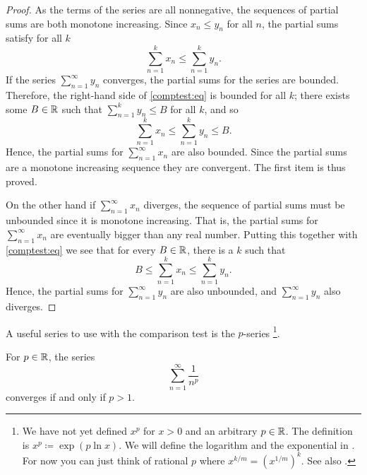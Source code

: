 \begin{proof}
As the terms of the series are all nonnegative, the sequences of
partial sums are both monotone increasing.
Since $x_n \leq y_n$ for all $n$, the partial sums
satisfy for all $k$
\begin{equation} \label{comptest:eq}
\sum_{n=1}^k x_n \leq \sum_{n=1}^k y_n .
\end{equation}
If the series $\sum_{n=1}^\infty y_n$ converges, the partial sums for the series
are bounded.  Therefore, the right-hand side of \eqref{comptest:eq}
is bounded for all $k$; there exists some $B \in {\mathbb{R}}$ such that
$\sum_{n=1}^k y_n \leq B$ for all $k$, and so
\begin{equation*}
\sum_{n=1}^k x_n \leq \sum_{n=1}^k y_n \leq B.
\end{equation*}
Hence, the partial sums for $\sum_{n=1}^\infty x_n$
are also bounded.  Since the partial sums are a monotone increasing sequence
they are convergent.  The first item is thus proved.

On the other hand if $\sum_{n=1}^\infty x_n$ diverges, the sequence of partial sums
must be unbounded since it is monotone increasing.  That is, the partial
sums for $\sum_{n=1}^\infty x_n$ are eventually bigger than any real number.  Putting this
together with \eqref{comptest:eq} we see that for every $B \in
{\mathbb{R}}$, there is a $k$ such that 
\begin{equation*}
B \leq \sum_{n=1}^k x_n \leq \sum_{n=1}^k y_n .
\end{equation*}
Hence, the partial sums for $\sum_{n=1}^\infty y_n$ are also unbounded, and
$\sum_{n=1}^\infty y_n$ also diverges.
\end{proof}

A useful series to use with the comparison test is the
$p$-series%
\footnote{We have not yet defined $x^p$ for $x > 0$ and
an arbitrary $p \in {\mathbb{R}}$.  The definition is $x^p \coloneqq \exp ( p \ln x )$.
We will define the logarithm and the exponential in .
For now you can just think of rational $p$
where $x^{k/m} = {(x^{1/m})}^{k}$.  See also .}.

\begin{prop}%
For $p \in {\mathbb{R}}$, 
the series
\begin{equation*}
\sum_{n=1}^\infty \frac{1}{n^p}
\end{equation*}
converges if and only if $p > 1$.
\end{prop}

